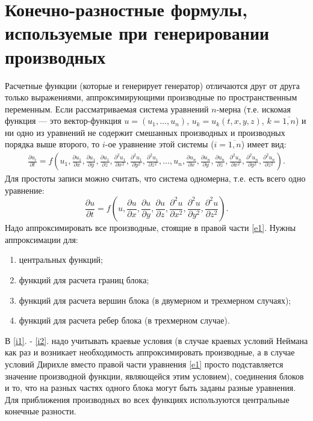 \documentclass[a4paper]{article}
\begin{document}
\section{\LARGE Конечно-разностные формулы, используемые при генерировании производных}
Расчетные функции (которые и генерирует генератор) отличаются друг от друга только выражениями, аппроксимирующими производные по пространственным пе\-ре\-мен\-ным. Если рассматриваемая система уравнений $n$-мерна (т.е. искомая функция --- это вектор-функция $u = (u_1, \ldots, u_n)$, $u_k = u_k(t,x,y,z)$, $k=\overline{1,n}$) и ни одно из уравнений не содержит смешанных производных и производных порядка выше вто\-ро\-го, то $i$-ое уравнение этой системы ($i = \overline{1,n}$) имеет вид:
\begin{multline*}
\frac{\partial u_i}{\partial t} = f\left(u_1, \frac{\partial u_1}{\partial x}, \frac{\partial u_1}{\partial y}, \frac{\partial u_1}{\partial z}, \frac{\partial^2 u_1}{\partial x^2}, \frac{\partial^2 u_1}{\partial y^2}, \frac{\partial^2 u_1}{\partial z^2}, \ldots , u_n, \frac{\partial u_n}{\partial x}, \frac{\partial u_n}{\partial y}, \frac{\partial u_n}{\partial z}, \frac{\partial^2 u_n}{\partial x^2}, \frac{\partial^2 u_n}{\partial y^2}, \frac{\partial^2 u_n}{\partial z^2} \right).
\end{multline*} 
Для простоты записи можно считать, что система одномерна, т.е. есть всего одно уравнение:
\begin{equation}\label{e1}
\frac{\partial u}{\partial t} = f\left(u, \frac{\partial u}{\partial x}, \frac{\partial u}{\partial y}, \frac{\partial u}{\partial z}, \frac{\partial^2 u}{\partial x^2}, \frac{\partial^2 u}{\partial y^2}, \frac{\partial^2 u}{\partial z^2}\right).
\end{equation} 
Надо аппроксимировать все производные, стоящие в правой части \eqref{e1}. Нужны аппро\-кси\-ма\-ции для:
\begin{enumerate}
\item центральных функций;
\item функций для расчета границ блока; \label {i1}
\item функций для расчета вершин блока (в двумерном и трехмерном случаях);
\item функций для расчета ребер блока (в трехмерном случае). \label{i2}
\end{enumerate}
В \ref{i1}. - \ref{i2}. надо учитывать краевые условия (в случае краевых условий Неймана как раз и возникает необходимость аппроксимировать производные, а в случае условий Дирихле вместо правой части уравнения \eqref{e1} просто подставляется значение про\-из\-вод\-ной функции, являющейся этим условием), соединения блоков и то, что на разных частях одного блока могут быть заданы разные уравнения. Для приближения про\-из\-вод\-ных во всех функциях используются центральные конечные разности.
\end{document}
